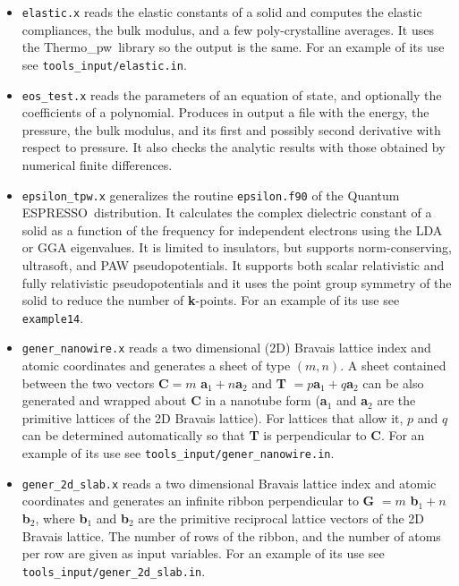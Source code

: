 \documentclass[12pt,a4paper,twoside]{report}
\def\qe{{\sc Quantum ESPRESSO}}
\def\thermo{{\sc Thermo}\_{\sc pw}}
\begin{document}
\begin{itemize}
\item \texttt{elastic.x} reads the elastic constants of a
solid and computes the elastic compliances, the bulk modulus, and a few
poly-crystalline averages. It uses the \thermo\ library so the output is the
same. 
For an example of its use see \texttt{tools\_input/elastic.in}.

\item \texttt{eos\_test.x} reads the parameters of an equation of state,
and optionally the coefficients of a polynomial. Produces in output
a file with the energy, the pressure, the bulk modulus, and its first
and possibly second derivative with respect to pressure.
It also checks the analytic results with those obtained by numerical
finite differences.

\item \texttt{epsilon\_tpw.x} generalizes the routine
\texttt{epsilon.f90} of the \qe\ distribution. It calculates the 
complex dielectric
constant of a solid as a function of the frequency for independent electrons
using the LDA or GGA eigenvalues. It is limited to insulators, but supports
norm-conserving, ultrasoft, and PAW pseudopotentials. It supports both scalar
relativistic and fully relativistic pseudopotentials and it uses the point
group symmetry of the solid to reduce the number of {\bf k}-points.
For an example of its use see \texttt{example14}.

\item \texttt{gener\_nanowire.x} reads a two dimensional (2D)
Bravais lattice index and atomic coordinates and generates a sheet of type
$(m,n)$. A sheet contained between the two vectors 
{\bf C}$ = m$ {\bf a}$_1 + n ${\bf a}$_2$ and {\bf T} $= p ${\bf a}$_1 + q ${\bf a}$_2$
can be also generated and wrapped about {\bf C} in a nanotube form 
({\bf a}$_1$ and {\bf a}$_2$ are the primitive lattices of the 2D Bravais 
lattice). 
For lattices that allow it, $p$ and $q$ can be determined automatically so that 
{\bf T} is perpendicular to {\bf C}.
For an example of its use see \texttt{tools\_input/gener\_nanowire.in}.

\item \texttt{gener\_2d\_slab.x} reads a two dimensional 
Bravais lattice index and atomic coordinates and generates an infinite ribbon
perpendicular to {\bf G} $= m$ {\bf b}$_1 + n ${\bf b}$_2$, where 
{\bf b}$_1$ and {\bf b}$_2$ are the primitive reciprocal lattice vectors 
of the 2D Bravais lattice. The number of rows of the ribbon, and the number of
atoms per row are given as input variables.
For an example of its use see \texttt{tools\_input/gener\_2d\_slab.in}.


\end{itemize}
\end{document}
